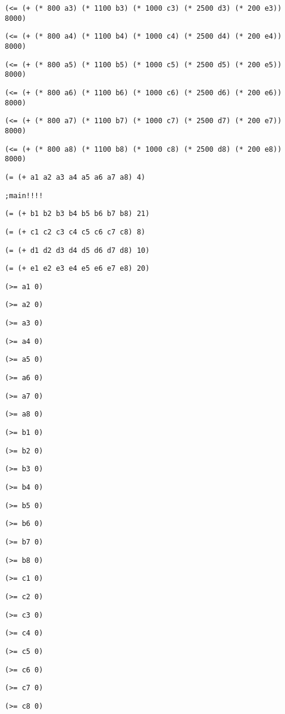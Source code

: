 \documentclass[12pt]{article}
\begin{document}
{{\tt  (<= (+ (* 800 a3) (* 1100 b3) (* 1000 c3) (* 2500 d3) (* 200 e3)) 8000) }

{\tt  (<= (+ (* 800 a4) (* 1100 b4) (* 1000 c4) (* 2500 d4) (* 200 e4)) 8000) }

{\tt  (<= (+ (* 800 a5) (* 1100 b5) (* 1000 c5) (* 2500 d5) (* 200 e5)) 8000) }

{\tt  (<= (+ (* 800 a6) (* 1100 b6) (* 1000 c6) (* 2500 d6) (* 200 e6)) 8000) }

{\tt  (<= (+ (* 800 a7) (* 1100 b7) (* 1000 c7) (* 2500 d7) (* 200 e7)) 8000) }

{\tt  (<= (+ (* 800 a8) (* 1100 b8) (* 1000 c8) (* 2500 d8) (* 200 e8)) 8000) }

{\tt  (= (+ a1 a2 a3 a4 a5 a6 a7 a8) 4) }

{\tt  ;main!!!! }

{\tt  (= (+ b1 b2 b3 b4 b5 b6 b7 b8) 21) }

{\tt  (= (+ c1 c2 c3 c4 c5 c6 c7 c8) 8) }

{\tt  (= (+ d1 d2 d3 d4 d5 d6 d7 d8) 10) }

{\tt  (= (+ e1 e2 e3 e4 e5 e6 e7 e8) 20) }

{\tt  (>= a1 0) }

{\tt  (>= a2 0) }

{\tt  (>= a3 0) }

{\tt  (>= a4 0) }

{\tt  (>= a5 0) }

{\tt  (>= a6 0) }

{\tt  (>= a7 0) }

{\tt  (>= a8 0) }

{\tt  (>= b1 0) }

{\tt  (>= b2 0) }

{\tt  (>= b3 0) }

{\tt  (>= b4 0) }

{\tt  (>= b5 0) }

{\tt  (>= b6 0) }

{\tt  (>= b7 0) }

{\tt  (>= b8 0) }

{\tt  (>= c1 0) }

{\tt  (>= c2 0) }

{\tt  (>= c3 0) }

{\tt  (>= c4 0) }

{\tt  (>= c5 0) }

{\tt  (>= c6 0) }

{\tt  (>= c7 0) }

{\tt  (>= c8 0) }

}
\end{document}
